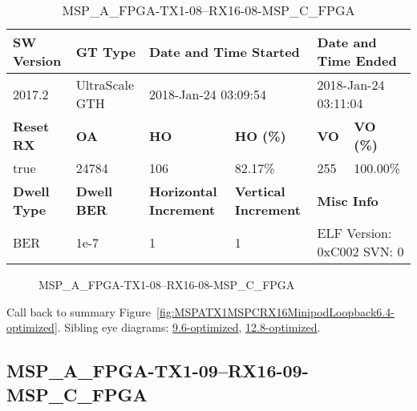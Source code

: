 \begin{table}[h]
\centering
\caption{MSP\_A\_FPGA-TX1-08--RX16-08-MSP\_C\_FPGA}
\label{tab:MSPAFPGATX108RX1608MSPCFPGA6.4-optimized}
\begin{tabular}{@{}|l|l|l|l|l|l|@{}}
\toprule
\textbf{SW Version}                & \textbf{GT Type}   & \multicolumn{2}{l|}{\textbf{Date and Time Started}}            & \multicolumn{2}{l|}{\textbf{Date and Time Ended}}        \\ \midrule
2017.2                       & UltraScale GTH          & \multicolumn{2}{l|}{2018-Jan-24 03:09:54}                   & \multicolumn{2}{l|}{2018-Jan-24 03:11:04}               \\ \midrule
\textbf{Reset RX}                  & \textbf{OA} & \textbf{HO}   & \textbf{HO (\%)} & \textbf{VO} & \textbf{VO (\%)} \\ \midrule
true & 24784        & 106          & 82.17\%        & 255        & 100.00\%       \\ \midrule
\textbf{Dwell Type}                & \textbf{Dwell BER} & \textbf{Horizontal Increment} & \textbf{Vertical Increment}    & \multicolumn{2}{l|}{\textbf{Misc Info}}                  \\ \midrule
BER                            & 1e-7        & 1        & 1           & \multicolumn{2}{l|}{ELF Version: 0xC002 SVN: 0}                         \\ \bottomrule
\end{tabular}
\end{table}

\begin{figure}[h]
\caption{MSP\_A\_FPGA-TX1-08--RX16-08-MSP\_C\_FPGA} \label{fig:MSPAFPGATX108RX1608MSPCFPGA6.4-optimized}
\end{figure}

Call back to summary Figure~\ref{fig:MSPATX1MSPCRX16MinipodLoopback6.4-optimized}.
Sibling eye diagrams: \hyperref[sec:MSPAFPGATX108RX1608MSPCFPGA9.6-optimized]{9.6-optimized}, \hyperref[sec:MSPAFPGATX108RX1608MSPCFPGA12.8-optimized]{12.8-optimized}.

\clearpage
\newpage


\subsection{MSP\_A\_FPGA-TX1-09--RX16-09-MSP\_C\_FPGA}\label{sec:MSPAFPGATX109RX1609MSPCFPGA6.4-optimized}

